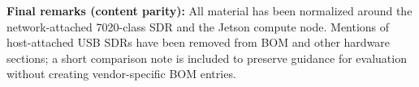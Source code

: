 \documentclass[11pt]{report}
\begin{document}
\begin{description}
\vspace{8pt}

\noindent\textbf{Final remarks (content parity):}  
All material has been normalized around the network-attached 7020-class SDR and the Jetson compute node. Mentions of host-attached USB SDRs have been removed from BOM and other hardware sections; a short comparison note is included to preserve guidance for evaluation without creating vendor-specific BOM entries.

\end{description}
\end{document}
